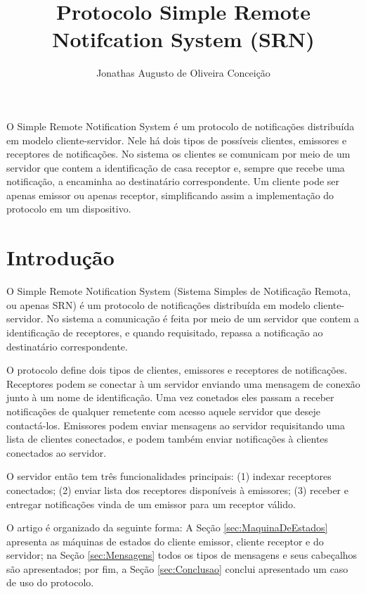 \documentclass[12pt]{article}
\title{Protocolo Simple Remote Notifcation System (SRN)}
\author{
	Jonathas Augusto de Oliveira Conceição\inst{1}
}
\begin{document}
\maketitle

\begin{resumo}
	O Simple Remote Notification System é um protocolo de notificações distribuída em modelo cliente-servidor.
	Nele há dois tipos de possíveis clientes, emissores e receptores de notificações.
	No sistema os clientes se comunicam por meio de um servidor que contem a identificação de casa receptor e,
	sempre que recebe uma notificação,
	a encaminha ao destinatário correspondente.
	Um cliente pode ser apenas emissor ou apenas receptor, simplificando assim a implementação do protocolo em um dispositivo.
\end{resumo}

\section{Introdução}

O Simple Remote Notification System (Sistema Simples de Notificação Remota, ou apenas SRN)
é um protocolo de notificações distribuída em modelo cliente-servidor.
No sistema a comunicação é feita por meio de um servidor que contem a identificação de receptores,
e quando requisitado, repassa a notificação ao destinatário correspondente.

O protocolo define dois tipos de clientes, emissores e receptores de notificações.
Receptores podem se conectar à um servidor enviando uma mensagem de conexão junto à um nome de identificação.
Uma vez conetados eles passam a receber notificações de qualquer remetente com acesso aquele servidor que deseje contactá-los.
Emissores podem enviar mensagens ao servidor requisitando uma lista de clientes conectados,
e podem também enviar notificações à clientes conectados ao servidor.

O servidor então tem três funcionalidades principais:
(1) indexar receptores conectados;
(2) enviar lista dos receptores disponíveis à emissores;
(3) receber e entregar notificações vinda de um emissor para um receptor válido.

O artigo é organizado da seguinte forma:
A Seção \ref{sec:MaquinaDeEstados} apresenta as máquinas de estados do cliente emissor, cliente receptor e do servidor;
na Seção \ref{sec:Mensagens} todos os tipos de mensagens e seus cabeçalhos são apresentados;
por fim, a Seção \ref{sec:Conclusao} conclui apresentado um caso de uso do protocolo.
\end{document}
